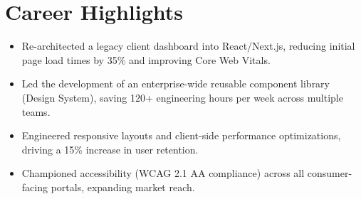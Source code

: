 \section{Career Highlights}
\begin{itemize}[leftmargin=*, noitemsep]
    \item Re-architected a legacy client dashboard into React/Next.js, reducing initial page load times by 35\% and improving Core Web Vitals.
    \item Led the development of an enterprise-wide reusable component library (Design System), saving 120+ engineering hours per week across multiple teams.
    \item Engineered responsive layouts and client-side performance optimizations, driving a 15\% increase in user retention.
    \item Championed accessibility (WCAG 2.1 AA compliance) across all consumer-facing portals, expanding market reach.
\end{itemize}